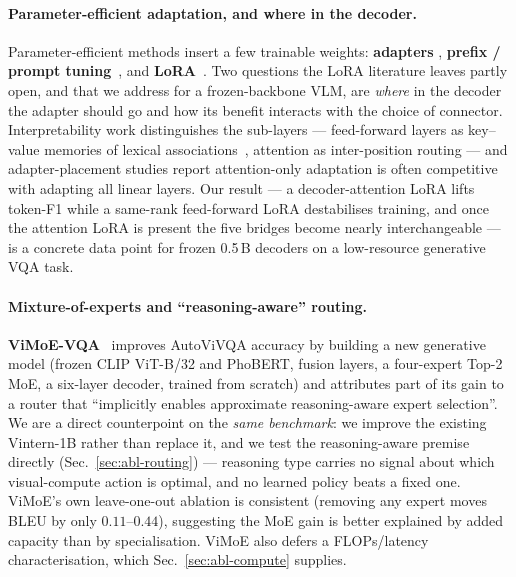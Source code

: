 \paragraph{Parameter-efficient adaptation, and where in the decoder.}
Parameter-efficient methods insert a few trainable weights: \textbf{adapters}
\cite{adapters}, \textbf{prefix / prompt tuning}~\cite{prefixtuning}, and
\textbf{LoRA}~\cite{lora}. Two questions the LoRA literature leaves partly open,
and that we address for a frozen-backbone VLM, are \emph{where} in the decoder the
adapter should go and how its benefit interacts with the choice of connector.
Interpretability work distinguishes the sub-layers --- feed-forward layers as
key--value memories of lexical associations~\cite{ffnkvmemory}, attention as
inter-position routing --- and adapter-placement studies report attention-only
adaptation is often competitive with adapting all linear layers. Our result --- a
decoder-attention LoRA lifts token-F1 while a same-rank feed-forward LoRA
destabilises training, and once the attention LoRA is present the five bridges
become nearly interchangeable --- is a concrete data point for frozen 0.5\,B
decoders on a low-resource generative VQA task.

\paragraph{Mixture-of-experts and ``reasoning-aware'' routing.}
\textbf{ViMoE-VQA}~\cite{vimoevqa} improves AutoViVQA accuracy by building a new
generative model (frozen CLIP ViT-B/32 and PhoBERT, fusion layers, a four-expert
Top-2 MoE, a six-layer decoder, trained from scratch) and attributes part of its
gain to a router that ``implicitly enables approximate reasoning-aware expert
selection''. We are a direct counterpoint on the \emph{same benchmark}: we
improve the existing Vintern-1B rather than replace it, and we test the
reasoning-aware premise directly (Sec.~\ref{sec:abl-routing}) --- reasoning type
carries no signal about which visual-compute action is optimal, and no learned
policy beats a fixed one. ViMoE's own leave-one-out ablation is consistent
(removing any expert moves BLEU by only $0.11$--$0.44$), suggesting the MoE gain
is better explained by added capacity than by specialisation. ViMoE also defers a
FLOPs/latency characterisation, which Sec.~\ref{sec:abl-compute} supplies.
